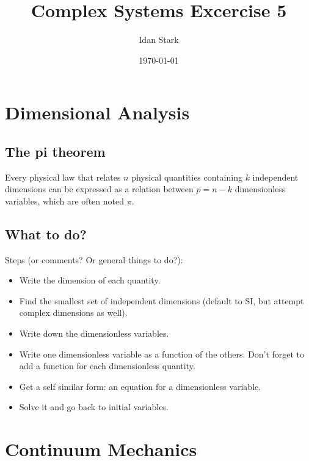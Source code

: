 \documentclass[twocolumn]{article}
\title{Complex Systems Excercise 5}
\author{Idan Stark}
\date{\today}
\begin{document}
\maketitle

\section{Dimensional Analysis}
\subsection{The pi theorem}
Every physical law that relates $n$ physical quantities containing $k$ independent dimensions
can be expressed as a relation between $p = n - k$ dimensionless variables, which are
often noted $\pi$.
\subsection{What to do?}
Steps (or comments? Or general things to do?):
\begin{itemize}
    \item Write the dimension of each quantity.
    \item Find the smallest set of independent dimensions (default to SI, but attempt complex dimensions as well).
    \item Write down the dimensionless variables.
    \item Write one dimensionless variable as a function of the others. Don't forget to add a function for each dimensionless quantity.
    \item Get a self similar form: an equation for a dimensionless variable.
    \item Solve it and go back to initial variables.
\end{itemize}
\section{Continuum Mechanics}
\end{document}
